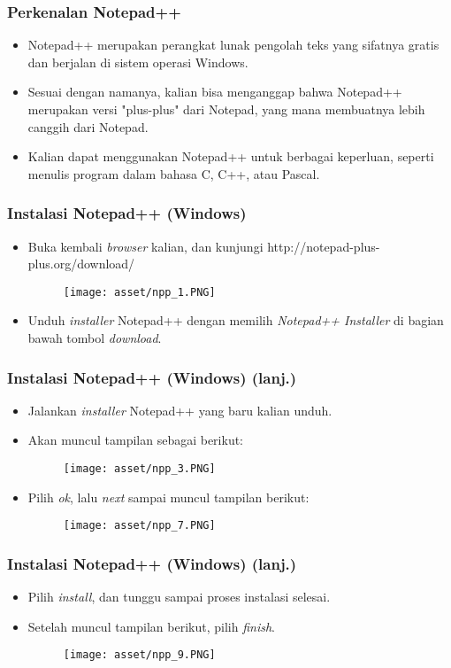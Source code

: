 \begin{frame}
\frametitle{Perkenalan Notepad++}
\begin{itemize}
  \item Notepad++ merupakan perangkat lunak pengolah teks yang sifatnya gratis dan berjalan di sistem operasi Windows.
  \item Sesuai dengan namanya, kalian bisa menganggap bahwa Notepad++ merupakan versi "plus-plus" dari Notepad, yang mana membuatnya lebih canggih dari Notepad.
  \item Kalian dapat menggunakan Notepad++ untuk berbagai keperluan, seperti menulis program dalam bahasa C, C++, atau Pascal.
\end{itemize}
\end{frame}

\begin{frame}
\frametitle{Instalasi Notepad++ (Windows)}
\begin{itemize}
  \item Buka kembali \textit{browser} kalian, dan kunjungi http://notepad-plus-plus.org/download/
  \begin{figure}
    \texttt{[image: asset/npp\_1.PNG]}
  \end{figure}
  \item Unduh \textit{installer} Notepad++ dengan memilih \textit{Notepad++ Installer} di bagian bawah tombol \textit{download}.
\end{itemize}
\end{frame}

\begin{frame}
\frametitle{Instalasi Notepad++ (Windows) (lanj.)}
\begin{itemize}
  \item Jalankan \textit{installer} Notepad++ yang baru kalian unduh.
  \item Akan muncul tampilan sebagai berikut:
  \begin{figure}
    \texttt{[image: asset/npp\_3.PNG]}
  \end{figure}
  \item Pilih \textit{ok}, lalu \textit{next} sampai muncul tampilan berikut:
  \begin{figure}
    \texttt{[image: asset/npp\_7.PNG]}
  \end{figure}
\end{itemize}
\end{frame}

\begin{frame}
\frametitle{Instalasi Notepad++ (Windows) (lanj.)}
\begin{itemize}
  \item Pilih \textit{install}, dan tunggu sampai proses instalasi selesai.
  \item Setelah muncul tampilan berikut, pilih \textit{finish}.
  \begin{figure}
    \texttt{[image: asset/npp\_9.PNG]}
  \end{figure}
\end{itemize}
\end{frame}

